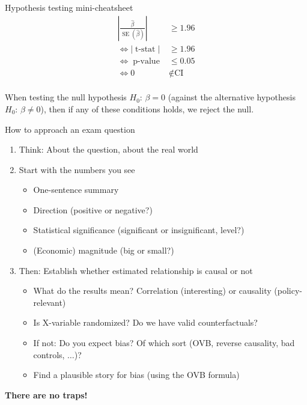 \documentclass[11pt]{beamer}
\begin{document}
\begin{frame}{Hypothesis testing mini-cheatsheet}
\vspace{-0.2cm}
\LARGE
\begin{align*}
    \left| \frac{\hat{\beta}}{\operatorname{SE}(\hat{\beta})} \right| &\geq 1.96 \\ 
    \Leftrightarrow | \operatorname{t-stat}| &\geq 1.96 \\  \Leftrightarrow \operatorname{p-value} &\leq 0.05 \\
    \Leftrightarrow 0 &\notin \text{CI}
\end{align*}
\\
\normalsize \alert{When testing the null hypothesis $H_0$: $\beta = 0$ (against the alternative hypothesis $H_0$: $\beta \neq 0$), then if any of these conditions holds, we reject the null.}

\end{frame}







\begin{frame}{How to approach an exam question}
\begin{enumerate}
    \item  Think: About the question, about the real world
    \item  Start with the numbers you see
    \begin{itemize}
        \item One-sentence summary \item Direction (positive or negative?) \item Statistical significance (significant or insignificant, level?) \item (Economic) magnitude (big or small?)
    \end{itemize}
\item Then: Establish whether estimated relationship is causal or not
\begin{itemize}
\item  What do the results mean? Correlation (interesting) or causality
(policy-relevant)
\item  Is X-variable randomized? Do we have valid counterfactuals?
\item  If not: Do you expect bias? Of which sort (OVB, reverse causality,
bad controls, $\dots$)?
\item Find a plausible story for bias (using the OVB formula)
\end{itemize}
\end{enumerate}
\textbf{\alert{There are no traps!}}
\end{frame}
\end{document}
